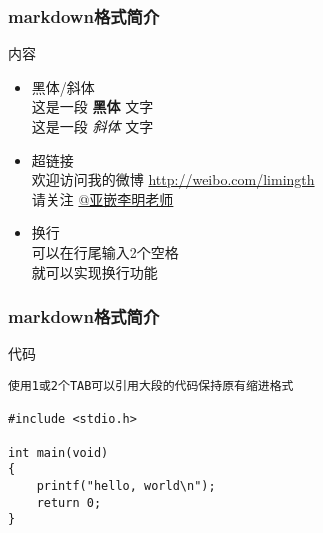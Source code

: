 \begin{frame}[fragile]\frametitle{markdown格式简介}

\begin{block}{内容}

\begin{itemize}
\item
  黑体/斜体\\ 这是一段 \textbf{黑体} 文字\\ 这是一段 \emph{斜体} 文字
\item
  超链接\\ 欢迎访问我的微博 \url{http://weibo.com/limingth}\\ 请关注
  \href{http://weibo.com/limingth}{@亚嵌李明老师}
\item
  换行\\ 可以在行尾输入2个空格\\ 就可以实现换行功能
\end{itemize}
\end{block}

\end{frame}

\begin{frame}[fragile]\frametitle{markdown格式简介}

\begin{block}{代码}

\begin{verbatim}
使用1或2个TAB可以引用大段的代码保持原有缩进格式 

#include <stdio.h>

int main(void)
{
    printf("hello, world\n");
    return 0;
}
\end{verbatim}
\end{block}

\end{frame}

